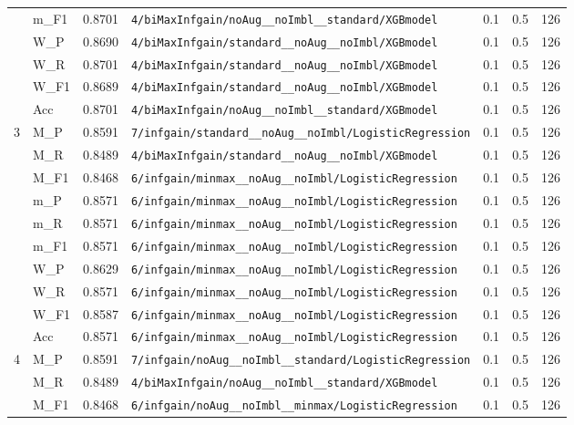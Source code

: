 \begin{table}[htbp]
\begin{tabular}{|c|l|c|>{\ttfamily\footnotesize}p{7.2cm}|c|c|c|}
 & m\_F1 & 0.8701 & \texttt{4/biMaxInfgain/noAug\_\_noImbl\_\_standard/XGBmodel} & 0.1 & 0.5  & 126 \\ 
 & W\_P & 0.8690 & \texttt{4/biMaxInfgain/standard\_\_noAug\_\_noImbl/XGBmodel} & 0.1 & 0.5  & 126 \\ 
 & W\_R & 0.8701 & \texttt{4/biMaxInfgain/standard\_\_noAug\_\_noImbl/XGBmodel} & 0.1 & 0.5  & 126 \\ 
 & W\_F1 & 0.8689 & \texttt{4/biMaxInfgain/standard\_\_noAug\_\_noImbl/XGBmodel} & 0.1 & 0.5  & 126 \\ 
 & Acc & 0.8701 & \texttt{4/biMaxInfgain/noAug\_\_noImbl\_\_standard/XGBmodel} & 0.1 & 0.5  & 126 \\ 
\hline
\multirow{10}{*}{3} & M\_P & 0.8591 & \texttt{7/infgain/standard\_\_noAug\_\_noImbl/LogisticRegression} & 0.1 & 0.5  & 126 \\ 
 & M\_R & 0.8489 & \texttt{4/biMaxInfgain/standard\_\_noAug\_\_noImbl/XGBmodel} & 0.1 & 0.5  & 126 \\ 
 & M\_F1 & 0.8468 & \texttt{6/infgain/minmax\_\_noAug\_\_noImbl/LogisticRegression} & 0.1 & 0.5  & 126 \\ 
 & m\_P & 0.8571 & \texttt{6/infgain/minmax\_\_noAug\_\_noImbl/LogisticRegression} & 0.1 & 0.5  & 126 \\ 
 & m\_R & 0.8571 & \texttt{6/infgain/minmax\_\_noAug\_\_noImbl/LogisticRegression} & 0.1 & 0.5  & 126 \\ 
 & m\_F1 & 0.8571 & \texttt{6/infgain/minmax\_\_noAug\_\_noImbl/LogisticRegression} & 0.1 & 0.5  & 126 \\ 
 & W\_P & 0.8629 & \texttt{6/infgain/minmax\_\_noAug\_\_noImbl/LogisticRegression} & 0.1 & 0.5  & 126 \\ 
 & W\_R & 0.8571 & \texttt{6/infgain/minmax\_\_noAug\_\_noImbl/LogisticRegression} & 0.1 & 0.5  & 126 \\ 
 & W\_F1 & 0.8587 & \texttt{6/infgain/minmax\_\_noAug\_\_noImbl/LogisticRegression} & 0.1 & 0.5  & 126 \\ 
 & Acc & 0.8571 & \texttt{6/infgain/minmax\_\_noAug\_\_noImbl/LogisticRegression} & 0.1 & 0.5  & 126 \\ 
\hline
\multirow{10}{*}{4} & M\_P & 0.8591 & \texttt{7/infgain/noAug\_\_noImbl\_\_standard/LogisticRegression} & 0.1 & 0.5  & 126 \\ 
 & M\_R & 0.8489 & \texttt{4/biMaxInfgain/noAug\_\_noImbl\_\_standard/XGBmodel} & 0.1 & 0.5  & 126 \\ 
 & M\_F1 & 0.8468 & \texttt{6/infgain/noAug\_\_noImbl\_\_minmax/LogisticRegression} & 0.1 & 0.5  & 126 \\ 

\end{tabular}
\end{table}
